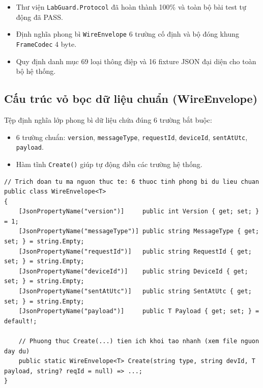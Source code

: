 \documentclass[12pt,a4paper]{article}
\begin{document}
\begin{summarybox}
\begin{itemize}[leftmargin=1.5em, itemsep=1pt]
  \item Thư viện \texttt{LabGuard.Protocol} đã hoàn thành 100\% và toàn bộ bài test tự động đã PASS.
  \item Định nghĩa phong bì \texttt{WireEnvelope} 6 trường cố định và bộ đóng khung \texttt{FrameCodec} 4 byte.
  \item Quy định danh mục 69 loại thông điệp và 16 fixture JSON đại diện cho toàn bộ hệ thống.
\end{itemize}
\end{summarybox}

\subsection{Cấu trúc vỏ bọc dữ liệu chuẩn (WireEnvelope)}
Tệp  định nghĩa lớp phong bì dữ liệu chứa đúng 6 trường bắt buộc:

\begin{orientationbox}
\begin{itemize}[leftmargin=1.5em, itemsep=1pt]
  \item 6 trường chuẩn: \texttt{version}, \texttt{messageType}, \texttt{requestId}, \texttt{deviceId}, \texttt{sentAtUtc}, \texttt{payload}.
  \item Hàm tĩnh \texttt{Create()} giúp tự động điền các trường hệ thống.
\end{itemize}
\end{orientationbox}

\begin{lstlisting}[language=CSharp, caption={Ví dụ rút gọn dựa trên mã nguồn hiện tại: src/LabGuard.Protocol/WireEnvelope.cs}]
// Trich doan tu ma nguon thuc te: 6 thuoc tinh phong bi du lieu chuan
public class WireEnvelope<T>
{
    [JsonPropertyName("version")]     public int Version { get; set; } = 1;
    [JsonPropertyName("messageType")] public string MessageType { get; set; } = string.Empty;
    [JsonPropertyName("requestId")]   public string RequestId { get; set; } = string.Empty;
    [JsonPropertyName("deviceId")]    public string DeviceId { get; set; } = string.Empty;
    [JsonPropertyName("sentAtUtc")]   public string SentAtUtc { get; set; } = string.Empty;
    [JsonPropertyName("payload")]     public T Payload { get; set; } = default!;

    // Phuong thuc Create(...) tien ich khoi tao nhanh (xem file nguon day du)
    public static WireEnvelope<T> Create(string type, string devId, T payload, string? reqId = null) => ...;
}
\end{lstlisting}
\end{document}
